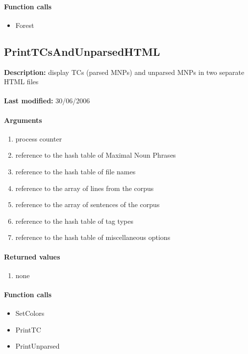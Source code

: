 \paragraph{Function calls}
\begin{itemize}
\item Forest
\end{itemize}

\subsection{PrintTCsAndUnparsedHTML}
\textbf{Description:} display TCs (parsed MNPs) and unparsed MNPs in two separate HTML files\\
\\\textbf{Last modified:} 30/06/2006

\paragraph{Arguments}
\begin{enumerate}
\item process counter
\item reference to the hash table of Maximal Noun Phrases
\item reference to the hash table of file names
\item reference to the array of lines from the corpus
\item reference to the array of sentences of the corpus
\item reference to the hash table of tag types
\item reference to the hash table of miscellaneous options
\end{enumerate}

\paragraph{Returned values}
\begin{enumerate}
\item none
\end{enumerate}

\paragraph{Function calls}
\begin{itemize}
\item SetColors
\item PrintTC
\item PrintUnparsed
\end{itemize}

